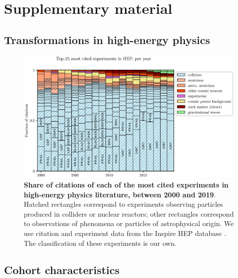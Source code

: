 \documentclass{article}
\begin{document}

\printbibliography

\newpage

\appendix

\section{Supplementary material}

\subsection{\label{appendix:landscape}Transformations in high-energy physics}

\begin{figure}[H]
    \centering
    \includegraphics[width=\textwidth]{plots/experiments.eps}
    \caption{\textbf{Share of citations of each of the most cited experiments in high-energy physics literature, between 2000 and 2019}. Hatched rectangles correspond to experiments observing particles produced in colliders or nuclear reactors; other rectangles correspond to observations of phenomena or particles of astrophysical origin. We use citation and experiment data from the Inspire HEP database \citep{InspireAPI}. The classification of these experiments is our own. }
    \label{fig:experiments}
\end{figure}


\subsection{\label{appendix:sample_characteristics}Cohort characteristics}
\end{document}
